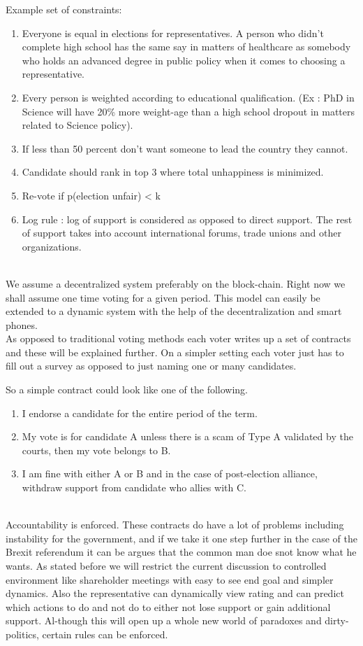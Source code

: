 \documentclass[a4paper]{article}
\begin{document}
Example set of constraints:
\begin{enumerate}
\item Everyone is equal in elections for representatives. A person who didn't complete high school has the same say in matters of healthcare as somebody who holds an advanced degree in public policy when it comes to choosing a representative.
\item Every person is weighted according to educational qualification. (Ex : PhD in Science will have 20\% more weight-age than a high school dropout in matters related to Science policy).
\item If  less than 50 percent don't want someone to lead the country they cannot.
\item Candidate should rank in top 3 where total unhappiness is minimized.
\item Re-vote if p(election unfair) < k
\item Log rule : log of support is considered as opposed to direct support. The rest of support takes into account international forums, trade unions and other organizations.
\end{enumerate}

\\
We assume a decentralized system preferably on the block-chain. Right now we shall assume one time voting for a given period. This model can easily be extended to a dynamic system with the help of the decentralization and smart phones. \\
As opposed to traditional voting methods each voter writes up a set of contracts and these will be explained further. On a simpler setting each voter just has to fill out a survey as opposed to just naming one or many candidates.

So a simple contract could look like one of the following.
\begin{enumerate}
\item I endorse a candidate for the entire period of the term.
\item My vote is for candidate A unless there is a scam of Type A validated by the courts, then my vote belongs to B.
\item I am fine with either A or B and in the case of post-election alliance, withdraw support from candidate who allies with C. 
\end{enumerate} \\
Accountability is enforced. These contracts do have a lot of problems including instability for the government, and if we take it one step further in the case of the Brexit referendum it can be argues that the common man doe snot know what he wants. As stated before we will restrict the current discussion to controlled environment like shareholder meetings with easy to see end goal and simpler dynamics.
Also the representative can dynamically view rating and can predict which actions to do and not do to either not lose support or gain additional support. Al-though this will open up a whole new world of paradoxes and dirty-politics, certain rules can be enforced. 
\end{document}
